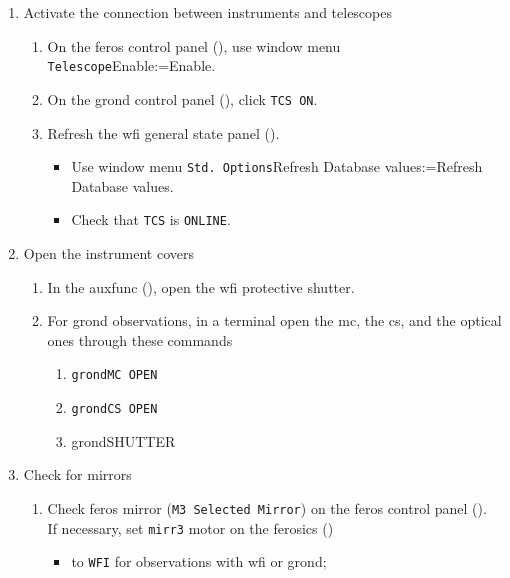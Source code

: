 \documentclass[11pt,fleqn,a4paper]{book}
\makeatletter
\def\menu#1#2{\texttt{#1}\ifx{}#2\else\@for\@x:=#2\do{$\rightarrow$\texttt{\@x}}\fi}
\def\wmenu#1#2{window menu \menu{#1}{#2}}
\makeatother
\begin{document}
\label{proc:insready}
\begin{enumerate}
   \item Activate the connection between instruments and telescopes
       \begin{enumerate}
         \item On the \gls{feros} control panel (), use \wmenu{Telescope}{Enable}.
         \item On the \gls{grond} control panel (), click \texttt{TCS ON}.
         \item Refresh the \gls{wfi} general state panel ().
               \begin{itemize}
                 \item Use \wmenu{Std. Options}{Refresh Database values}.
                 \item Check that \texttt{TCS} is \texttt{ONLINE}.
               \end{itemize}
       \end{enumerate}
  \item  Open the instrument covers
    \label{list:opencov}
     \begin{enumerate}
        \item In the \gls{auxfunc} (), open the 
              \gls{wfi} \gls{protective shutter}.
        \item For \gls{grond} observations, in a terminal open the \gls{mc}, the \gls{cs}, and the optical ones through these commands
            \begin{enumerate}
              \item \texttt{\gls{grondMC} OPEN}
              \item \texttt{\gls{grondCS} OPEN}
              \item \gls{grondSHUTTER}
            \end{enumerate}
     \end{enumerate}
  \item Check for mirrors
     \label{list:checkmirror}
     \begin{enumerate}
        \item Check \gls{feros} mirror (\texttt{\gls{M3} Selected Mirror}) on the \gls{feros} control panel ().\\
              If necessary, set \texttt{\gls{mirr3}} motor on the \gls{ferosics} ()
              \begin{itemize}
                \item to \texttt{WFI} for observations with \gls{wfi} or \gls{grond};

\end{itemize}
\end{enumerate}
\end{enumerate}
\end{document}
